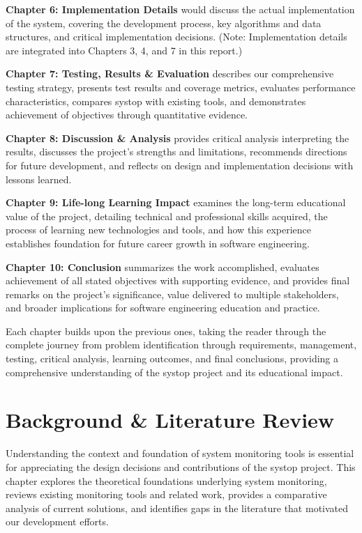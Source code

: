 \documentclass[12pt,a4paper,oneside]{report}
\begin{document}
\textbf{Chapter 6: Implementation Details} would discuss the actual implementation of the system, covering the development process, key algorithms and data structures, and critical implementation decisions. (Note: Implementation details are integrated into Chapters 3, 4, and 7 in this report.)

\textbf{Chapter 7: Testing, Results \& Evaluation} describes our comprehensive testing strategy, presents test results and coverage metrics, evaluates performance characteristics, compares systop with existing tools, and demonstrates achievement of objectives through quantitative evidence.

\textbf{Chapter 8: Discussion \& Analysis} provides critical analysis interpreting the results, discusses the project's strengths and limitations, recommends directions for future development, and reflects on design and implementation decisions with lessons learned.

\textbf{Chapter 9: Life-long Learning Impact} examines the long-term educational value of the project, detailing technical and professional skills acquired, the process of learning new technologies and tools, and how this experience establishes foundation for future career growth in software engineering.

\textbf{Chapter 10: Conclusion} summarizes the work accomplished, evaluates achievement of all stated objectives with supporting evidence, and provides final remarks on the project's significance, value delivered to multiple stakeholders, and broader implications for software engineering education and practice.

Each chapter builds upon the previous ones, taking the reader through the complete journey from problem identification through requirements, management, testing, critical analysis, learning outcomes, and final conclusions, providing a comprehensive understanding of the systop project and its educational impact.

\chapter{Background \& Literature Review}
\label{chap:background}

Understanding the context and foundation of system monitoring tools is essential for appreciating the design decisions and contributions of the systop project. This chapter explores the theoretical foundations underlying system monitoring, reviews existing monitoring tools and related work, provides a comparative analysis of current solutions, and identifies gaps in the literature that motivated our development efforts.
\end{document}
